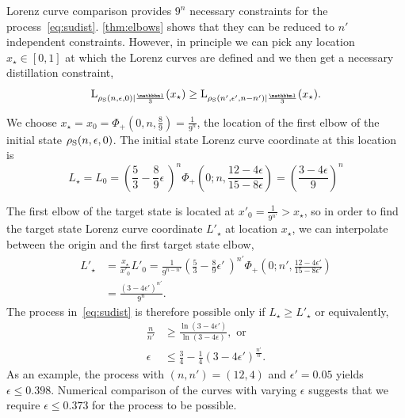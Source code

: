 \documentclass[pra,
aps,
twocolumn,
superscriptaddress,
groupedaddress,
nofootinbib,
reprint
]{revtex4-1}
\begin{document}
Lorenz curve comparison provides $9^n$ necessary constraints for the process~\cref{eq:sudist}.
\cref{thm:elbows} shows that they can be reduced to $n'$ independent constraints.
However, in principle we can pick any location $x_\star \in [0,1]$ at which the Lorenz curves are defined and we then get a necessary distillation constraint, 
\begin{equation}
	\lc{\rho_{\rm{S}}(n, \epsilon, 0)}{\frac{\id}{3}}(x_\star) \geq \lc{\rho_{\rm{S}}(n', \epsilon', n-n')}{\frac{\id}{3}}(x_\star).
\end{equation}

We choose $x_\star = x_0 = \Phi_+(0, n, \frac{8}{9}) = \frac{1}{9^{n}}$, the location of the first elbow of the initial state $\rho_{\rm{S}}(n, \epsilon, 0)$.
The initial state Lorenz curve coordinate at this location is
\begin{equation}
	L_\star = L_0 = \left( \frac{5}{3} - \frac{8}{9}\epsilon\ \right)^{n} \Phi_+\left(0;n,\frac{12-4\epsilon}{15-8\epsilon}\right) = \left(\frac{3-4\epsilon}{9}\right)^n
\end{equation}

The first elbow of the target state is located at $x'_0 = \frac{1}{9^{n'}} > x_\star$, so in order to find the target state Lorenz curve coordinate $L'_\star$ at location $x_\star$, we can interpolate between the origin and the first target state elbow, 
\begin{equation}\label{eq:constraint_deriv}
	\begin{split}
	L'_\star &= \frac{x_\star}{x'_0}L'_0 = \frac{1}{9^{n-n'}}\left( \frac{5}{3} - \frac{8}{9}\epsilon'\ \right)^{n'}\Phi_+\left(0;n',\frac{12-4\epsilon'}{15-8\epsilon'}\right) \\
	&= \frac{(3-4\epsilon')^{n'}}{9^{n}}.
	\end{split}
\end{equation}
The process in~\cref{eq:sudist} is therefore possible only if $L_\star \geq L'_\star$ or equivalently,
\begin{align}
	\frac{n}{n'} &\geq \frac{\ln{(3-4\epsilon')}}{\ln{(3-4\epsilon)}}, \text{ or}\\
	\epsilon &\leq \frac{3}{4} - \frac{1}{4}(3-4\epsilon')^{\frac{n'}{n}}.
\end{align}
As an example, the process with $(n, n') = (12, 4)$ and $\epsilon' = 0.05$ yields $\epsilon \leq 0.398$.
Numerical comparison of the curves with varying $\epsilon$ suggests that we require $\epsilon \leq 0.373$ for the process to be possible.
\end{document}
